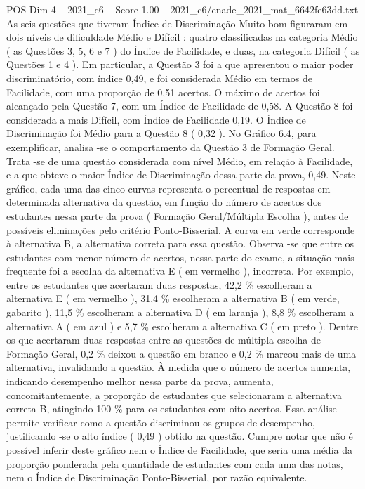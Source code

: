 \begin{textsample}{POS Dim 4 – 2021\_c6 – Score 1.00 – 2021\_c6/enade\_2021\_mat\_6642fe63dd.txt}
As seis questões que tiveram Índice de Discriminação Muito bom figuraram em dois níveis de dificuldade Médio e Difícil : quatro classificadas na categoria Médio ( as Questões 3, 5, 6 e 7 ) do Índice de Facilidade, e duas, na categoria Difícil ( as Questões 1 e 4 ).
Em particular, a Questão 3 foi a que apresentou o maior poder discriminatório, com índice 0,49, e foi considerada Médio em termos de Facilidade, com uma proporção de 0,51 acertos.
O máximo de acertos foi alcançado pela Questão 7, com um Índice de Facilidade de 0,58.
A Questão 8 foi considerada a mais Difícil, com Índice de Facilidade 0,19.
O Índice de Discriminação foi Médio para a Questão 8 ( 0,32 ).
No Gráfico 6.4, para exemplificar, analisa -se o comportamento da Questão 3 de Formação Geral.
Trata -se de uma questão considerada com nível Médio, em relação à Facilidade, e a que obteve o maior Índice de Discriminação dessa parte da prova, 0,49.
Neste gráfico, cada uma das cinco curvas representa o percentual de respostas em determinada alternativa da questão, em função do número de acertos dos estudantes nessa parte da prova ( Formação Geral/Múltipla Escolha ), antes de possíveis eliminações pelo critério Ponto-Bisserial.
A curva em verde corresponde à alternativa B, a alternativa correta para essa questão.
Observa -se que entre os estudantes com menor número de acertos, nessa parte do exame, a situação mais frequente foi a escolha da alternativa E ( em vermelho ), incorreta.
Por exemplo, entre os estudantes que acertaram duas respostas, 42,2 \% escolheram a alternativa E ( em vermelho ), 31,4 \% escolheram a alternativa B ( em verde, gabarito ), 11,5 \% escolheram a alternativa D ( em laranja ), 8,8 \% escolheram a alternativa A ( em azul ) e 5,7 \% escolheram a alternativa C ( em preto ).
Dentre os que acertaram duas respostas entre as questões de múltipla escolha de Formação Geral, 0,2 \% deixou a questão em branco e 0,2 \% marcou mais de uma alternativa, invalidando a questão.
À medida que o número de acertos aumenta, indicando desempenho melhor nessa parte da prova, aumenta, concomitantemente, a proporção de estudantes que selecionaram a alternativa correta B, atingindo 100 \% para os estudantes com oito acertos.
Essa análise permite verificar como a questão discriminou os grupos de desempenho, justificando -se o alto índice ( 0,49 ) obtido na questão.
Cumpre notar que não é possível inferir deste gráfico nem o Índice de Facilidade, que seria uma média da proporção ponderada pela quantidade de estudantes com cada uma das notas, nem o Índice de Discriminação Ponto-Bisserial, por razão equivalente.

\end{textsample}

